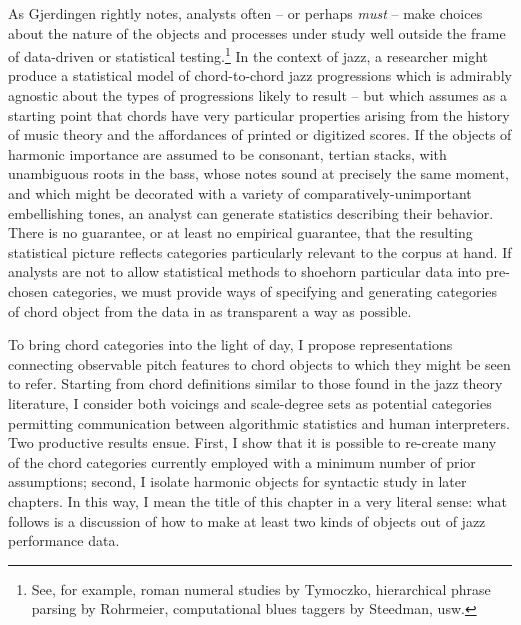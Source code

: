 As Gjerdingen rightly notes, analysts often -- or perhaps \emph{must} -- make choices about the nature of the objects and processes under study well outside the frame of data-driven or statistical testing.\footnote{See, for example, roman numeral studies by Tymoczko, hierarchical phrase parsing by Rohrmeier, computational blues taggers by Steedman, usw.}  In the context of jazz, a researcher might produce a statistical model of chord-to-chord jazz progressions which is admirably agnostic about the types of progressions likely to result -- but which assumes as a starting point that chords have very particular properties arising from the history of music theory and the affordances of printed or digitized scores.  If the objects of harmonic importance are assumed to be consonant, tertian stacks, with unambiguous roots in the bass, whose notes sound at precisely the same moment, and which might be decorated with a variety of comparatively-unimportant embellishing tones, an analyst can generate statistics describing their behavior.  There is no guarantee, or at least no empirical guarantee, that the resulting statistical picture reflects categories particularly relevant to the corpus at hand.  If analysts are not to allow statistical methods to shoehorn particular data into pre-chosen categories, we must provide ways of specifying and generating categories of chord object from the data in as transparent a way as possible.

To bring chord categories into the light of day, I propose representations connecting observable pitch features to chord objects to which they might be seen to refer.  Starting from chord definitions similar to those found in the jazz theory literature, I consider both voicings and scale-degree sets as potential categories permitting communication between algorithmic statistics and human interpreters.  Two productive results ensue.  First, I show that it is possible to re-create many of the chord categories currently employed with a minimum number of prior assumptions; second, I isolate harmonic objects for syntactic study in later chapters.  In this way, I mean the title of this chapter in a very literal sense: what follows is a discussion of how to make at least two kinds of objects out of jazz performance data.

